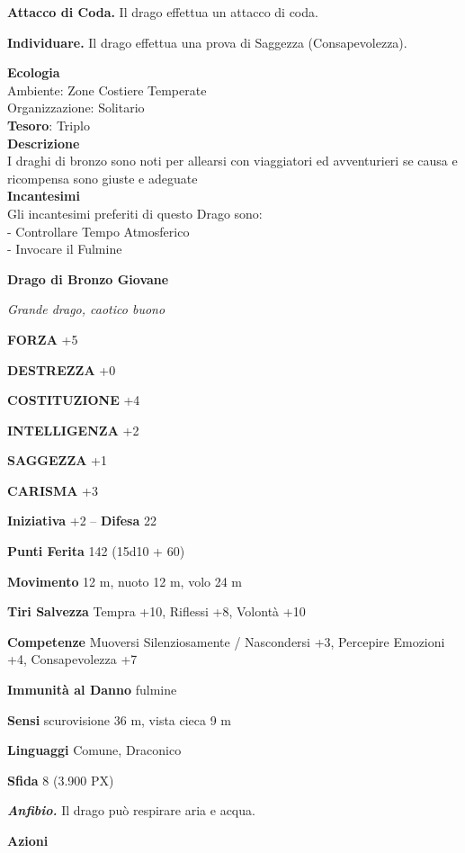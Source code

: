 \begin{multicols}{2}
	\textbf{Attacco di Coda.} Il drago effettua un attacco di coda.

	\textbf{Individuare.} Il drago effettua una prova di Saggezza (Consapevolezza).

	\textbf{Ecologia}\\
	Ambiente: Zone Costiere Temperate\\
	Organizzazione: Solitario\\
	\textbf{Tesoro}: Triplo\\
	\textbf{Descrizione}\\
	I draghi di bronzo sono noti per allearsi con viaggiatori ed avventurieri se causa e ricompensa sono giuste e adeguate\\
	\textbf{Incantesimi}\\
	Gli incantesimi preferiti di questo Drago sono:\\
	- Controllare Tempo Atmosferico\\
	- Invocare il Fulmine


	\medskip{}\textbf{Drago di Bronzo Giovane}

	\textit{Grande drago, caotico buono}

	\textbf{FORZA} +5

	\textbf{DESTREZZA} +0

	\textbf{COSTITUZIONE} +4

	\textbf{INTELLIGENZA} +2

	\textbf{SAGGEZZA} +1

	\textbf{CARISMA} +3

	\textbf{Iniziativa} +2 -- \textbf{Difesa} 22

	\textbf{Punti Ferita} 142 (15d10 + 60)

	\textbf{Movimento} 12 m, nuoto 12 m, volo 24 m

	\textbf{Tiri Salvezza} Tempra +10, Riflessi +8, Volontà +10

	\textbf{Competenze} Muoversi Silenziosamente / Nascondersi +3, Percepire Emozioni +4, Consapevolezza +7

	\textbf{Immunità al Danno} fulmine

	\textbf{Sensi} scurovisione 36 m, vista cieca 9 m

	\textbf{Linguaggi} Comune, Draconico

	\textbf{Sfida} 8 (3.900 PX)

	\textit{\textbf{Anfibio.}} Il drago può respirare aria e acqua.

	\textbf{Azioni}


\end{multicols}
